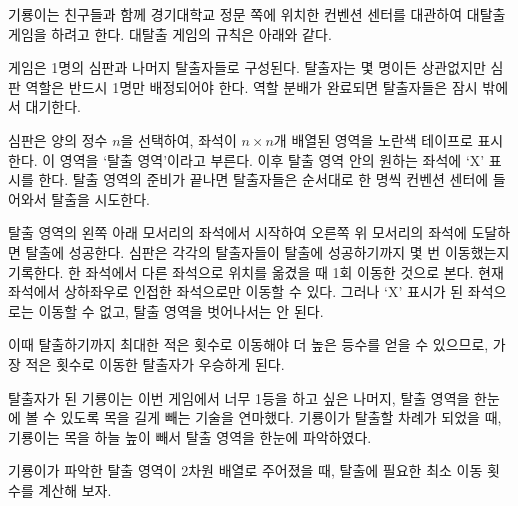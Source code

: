 기룡이는 친구들과 함께 경기대학교 정문 쪽에 위치한 컨벤션 센터를 대관하여 대탈출 게임을 하려고 한다.
대탈출 게임의 규칙은 아래와 같다.

게임은 1명의 심판과 나머지 탈출자들로 구성된다.
탈출자는 몇 명이든 상관없지만 심판 역할은 반드시 1명만 배정되어야 한다.
역할 분배가 완료되면 탈출자들은 잠시 밖에서 대기한다.

심판은 양의 정수 $n$을 선택하여, 좌석이 $n \times n$개 배열된 영역을 노란색 테이프로 표시한다. 이 영역을 `탈출 영역'이라고 부른다.
이후 탈출 영역 안의 원하는 좌석에 `X' 표시를 한다.
탈출 영역의 준비가 끝나면 탈출자들은 순서대로 한 명씩 컨벤션 센터에 들어와서 탈출을 시도한다.

탈출 영역의 왼쪽 아래 모서리의 좌석에서 시작하여 오른쪽 위 모서리의 좌석에 도달하면 탈출에 성공한다.
심판은 각각의 탈출자들이 탈출에 성공하기까지 몇 번 이동했는지 기록한다.
한 좌석에서 다른 좌석으로 위치를 옮겼을 때 1회 이동한 것으로 본다.
현재 좌석에서 상하좌우로 인접한 좌석으로만 이동할 수 있다.
그러나 `X' 표시가 된 좌석으로는 이동할 수 없고, 탈출 영역을 벗어나서는 안 된다.

이때 탈출하기까지 최대한 적은 횟수로 이동해야 더 높은 등수를 얻을 수 있으므로, 가장 적은 횟수로 이동한 탈출자가 우승하게 된다.

탈출자가 된 기룡이는 이번 게임에서 너무 1등을 하고 싶은 나머지, 탈출 영역을 한눈에 볼 수 있도록 목을 길게 빼는 기술을 연마했다.
기룡이가 탈출할 차례가 되었을 때, 기룡이는 목을 하늘 높이 빼서 탈출 영역을 한눈에 파악하였다.

기룡이가 파악한 탈출 영역이 2차원 배열로 주어졌을 때, 탈출에 필요한 최소 이동 횟수를 계산해 보자.
